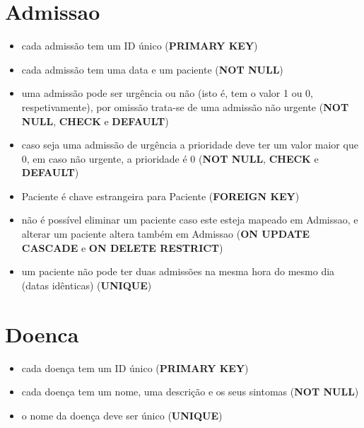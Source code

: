 \documentclass[article, a4paper, 12pt, oneside]{memoir}
\begin{document}
\section*{Admissao}
\begin{itemize}
	\item cada admissão tem um ID único (\textbf{PRIMARY KEY})
	\item cada admissão tem uma data e um paciente (\textbf{NOT NULL})
	\item uma admissão pode ser urgência ou não (isto é, tem o valor 1 ou 0, respetivamente), por omissão trata-se de uma admissão não urgente (\textbf{NOT NULL}, \textbf{CHECK} e \textbf{DEFAULT})
	\item caso seja uma admissão de urgência a prioridade deve ter um valor maior que 0, em caso não urgente, a prioridade é 0 (\textbf{NOT NULL}, \textbf{CHECK} e \textbf{DEFAULT})
	\item Paciente é chave estrangeira para Paciente (\textbf{FOREIGN KEY})
	\item não é possível eliminar um paciente caso este esteja mapeado em Admissao, e alterar um paciente altera também em Admissao (\textbf{ON UPDATE CASCADE} e \textbf{ON DELETE RESTRICT})
	\item um paciente não pode ter duas admissões na mesma hora do mesmo dia (datas idênticas) (\textbf{UNIQUE})
\end{itemize}

\section*{Doenca}
\begin{itemize}
	\item cada doença tem um ID único (\textbf{PRIMARY KEY})
	\item cada doença tem um nome, uma descrição e os seus sintomas (\textbf{NOT NULL})
	\item o nome da doença deve ser único (\textbf{UNIQUE})
\end{itemize}

\newpage
\end{document}
